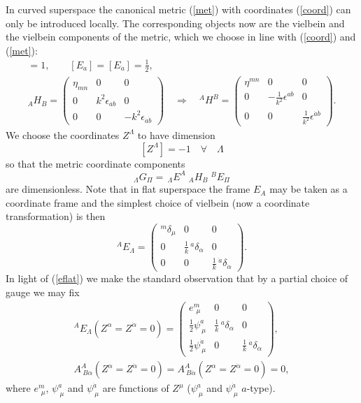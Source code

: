 \documentclass[a4paper,12pt]{article}
\newcommand{\al}{\ensuremath{\alpha}}
\newcommand{\La}{\ensuremath{\Lambda}}
\newcommand{\de}{\ensuremath{\delta}}
\newcommand{\ep}{\ensuremath{\epsilon}}
\newcommand{\sfrac}[2]{\ensuremath{{\scriptstyle \frac{#1}{#2}}}}
\begin{document}
In curved superspace the canonical metric (\ref{met}) with coordinates (\ref{coord}) can only be introduced locally. The corresponding objects now are the vielbein and the vielbein components of the metric, which we choose in line with 
(\ref{coord}) and (\ref{met}):
\begin{gather*}
[E_m]=1, \qquad [E_a]=[E_{\dot{a}}]=\sfrac{1}{2}, \\[8pt]
_A H_B=\left(\begin{array}{ccc} \eta_{mn} & 0 & 0 \\
0 & k^2\ep_{ab} & 0 \\
0 & 0 & -k^2\ep_{\dot{a}\dot{b}} \end{array}\right) \quad
\Rightarrow \quad ^A H^B=\left(\begin{array}{ccc} \eta^{mn} & 0 & 0 \\
0 & -\frac{1}{k^2}\ep^{ab} & 0 \\
0 & 0 & \frac{1}{k^2}\ep^{\dot{a}\dot{b}} \end{array}\right).
\end{gather*}
We choose the coordinates $Z^\La$ to have dimension
\[
[Z^\La]=-1\quad \forall \quad {\scriptstyle \La} 
\]
so that the metric coordinate components 
\[
_\La G_\Pi=\,_\La E^A\;_AH_B\;^B\!E_\Pi
\]
are dimensionless. Note that in flat superspace the frame $E_A$ may be taken as a coordinate frame and the simplest choice of vielbein (now a coordinate transformation) is then
\begin{equation} \label{eflat}
^A\!E_\La=\left(\begin{array}{ccc} ^m\de_\mu & 0 & 0 \\
0 & \frac{1}{k}\,^a\de_\al & 0 \\
0 & 0 & \frac{1}{k}\,^{\dot{a}}\de_{\dot{\al}} \end{array}\right).
\end{equation}
In light of (\ref{eflat}) we make the standard observation that by a partial choice of gauge we may fix
\begin{gather}
^A\!E_\La(Z^\al=Z^{\dot{\al}}=0)=\left(\begin{array}{ccc} e^m_{\ \,\mu} & 0 & 0 \\
\frac{1}{2}\psi^a_{\ \mu} & \frac{1}{k}\,^a\de_\al & 0 \\
\frac{1}{2}\psi^{\dot{a}}_{\ \mu} & 0 & \frac{1}{k}\,^{\dot{a}}\de_{\dot{\al}} \end{array}\right), \label{ecurv} \\
A^A_{\ B\al}(Z^\al=Z^{\dot{\al}}=0)=A^A_{\ B\dot{\al}}(Z^\al=Z^{\dot{\al}}=0)=0, \label{A=0}
\end{gather}
where $e^m_{\ \,\mu}$, $\psi^a_{\ \mu}$ and $\psi^{\dot{a}}_{\ \mu}$ are functions of $Z^\mu$ ($\psi^a_{\ \mu}$ and $\psi^{\dot{a}}_{\ \mu}$ $a$-type).
\end{document}
